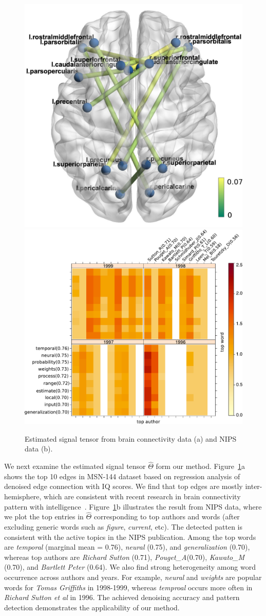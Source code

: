 \documentclass{article}
\theoremstyle{plain}
\theoremstyle{definition}
\begin{document}
\begin{figure}[h!]
\vspace{-.3cm}
\centering
\includegraphics[width=.2\textwidth]{figure/brainIQ.pdf}
\includegraphics[width=.27\textwidth]{figure/signal.pdf}
\caption{Estimated signal tensor from brain connectivity data (a) and NIPS data (b). %
}\label{fig:signal}
\vspace{-.3cm}
\end{figure}

We next examine the estimated signal tensor $\hat \Theta$ form our method. Figure~\ref{fig:signal}a shows the top 10 edges in MSN-144 dataset based on regression analysis of denoised edge connection with IQ scores. We find that top edges are mostly inter-hemisphere, which are consistent with recent research in brain connectivity pattern with intelligence~\cite{li2009brain,wang2017bayesian}. Figure~\ref{fig:signal}b illustrates the result from NIPS data, where we plot the top entries in $\hat \Theta$ corresponding to top authors and words (after excluding generic words such as \emph{figure}, \emph{current}, etc). The detected patten is consistent with the active topics in the NIPS publication. Among the top words are \emph{temporal} (marginal mean = 0.76), \emph{neural} (0.75), and \emph{generalization} (0.70), whereas top authors are \emph{Richard Sutton} (0.71), \emph{Pouget\_A}(0.70), \emph{Kawato\_M} (0.70), and \emph{Bartlett Peter} (0.64). We also find strong heterogeneity among word occurrence across authors and years. For example, \emph{neural} and \emph{weights} are popular words for \emph{Tomas Griffiths} in 1998-1999, whereas \emph{temproal} occurs more often in \emph{Richard Sutton et al} in 1996. The achieved denoising accuracy and pattern detection demonstrates the applicability of our method.
\end{document}

